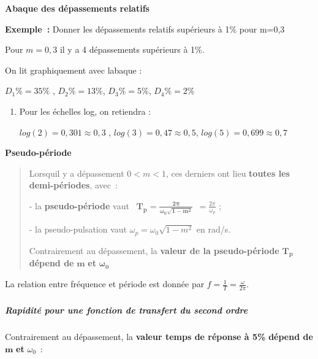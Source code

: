 \textbf{Abaque des dépassements relatifs}

\textbf{Exemple~:} Donner les dépassements relatifs supérieurs à 1\% pour m=0,3

Pour \(m = 0,3\) il y a 4 dépassements supérieurs à 1\%.

On lit graphiquement avec l\textquotesingle abaque :

\(D_{1}\% = 35\%\) , \(D_{2}\% = 13\%\), \(D_{3}\% = 5\%\), \(D_{4}\% = 2\%\)

\begin{enumerate}
\item
  Pour les échelles log, on retiendra :

  \(log(2) = 0,301 \approx 0,3\) , \(log(3) = 0,47 \approx 0,5\), \(log(5) = 0,699 \approx 0,7\)
\end{enumerate}

\textbf{Pseudo-période}

\begin{quote}
Lorsqu\textquotesingle il y a dépassement \(0\mathbf{<}m < 1\), ces derniers ont lieu \textbf{toutes les demi-périodes}, avec~:

- la \textbf{pseudo-période} vaut ~\(\mathbf{T}_{\mathbf{p}}\mathbf{=}\frac{\mathbf{2}\mathbf{\pi}}{\mathbf{\omega}_{\mathbf{0}}\sqrt{\mathbf{1 -}\mathbf{m}^{\mathbf{2}}}}\ \  = \frac{2\pi}{\omega_{p}}\) ;

- la pseudo-pulsation vaut \(\omega_{p} = \omega_{0}\sqrt{1 - m^{2}}\) en rad/s.

Contrairement au dépassement, la \textbf{valeur de la pseudo-période} \(\mathbf{T}_{\mathbf{p}}\) \textbf{dépend de} \(\mathbf{m}\) \textbf{et} \(\mathbf{\omega}_{\mathbf{0}}\)
\end{quote}

La relation entre fréquence et période est donnée par \(f = \frac{1}{T} = \frac{\omega}{2\pi}\).

\hypertarget{section-12}{%
\subparagraph*{}\label{section-12}}

\hypertarget{rapidituxe9-pour-une-fonction-de-transfert-du-second-ordre}{%
\subparagraph*{Rapidité pour une fonction de transfert du second ordre}\label{rapidituxe9-pour-une-fonction-de-transfert-du-second-ordre}}

Contrairement au dépassement, la \textbf{valeur temps de réponse à 5\%} \textbf{dépend de} \(\mathbf{m}\) \textbf{et} \(\omega_{0}\)~:

